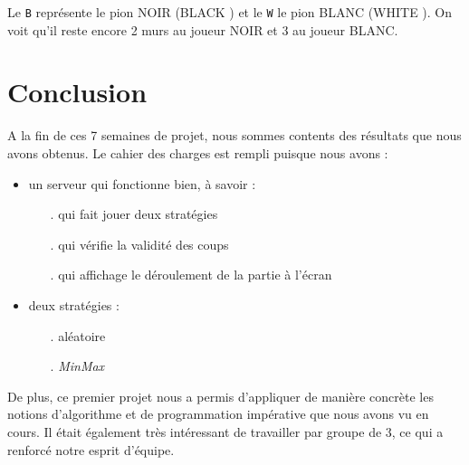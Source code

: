 \documentclass[12pt,a4paper]{article}
\begin{document}
Le \verb,B, représente le pion NOIR (\og BLACK \fg{}) et le \verb,W, le pion BLANC (\og WHITE \fg{}). On voit qu'il reste encore 2 murs au joueur NOIR et 3 au joueur BLANC.

\newpage
\section*{Conclusion}

A la fin de ces 7 semaines de projet, nous sommes contents des résultats que nous avons 
obtenus. Le cahier des charges est rempli puisque nous avons :
\begin{itemize}
  \item un serveur qui fonctionne bien, à savoir :
    \begin{itemize}
      \item[.] qui fait jouer deux stratégies
      \item[.] qui vérifie la validité des coups
      \item[.] qui affichage le déroulement de la partie à l'écran
    \end{itemize}
  \item deux stratégies :
    \begin{itemize}
      \item[.] aléatoire
      \item[.] \textit{MinMax} \\
    \end{itemize}
\end{itemize}

De plus, ce premier projet nous a permis d'appliquer de manière concrète les notions d'algorithme et de programmation impérative que nous avons vu en cours. Il était également très intéressant de travailler par groupe de 3, ce qui a renforcé notre esprit d'équipe.
\end{document}

